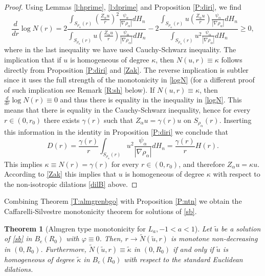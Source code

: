 \documentclass[11pt]{amsart}
\theoremstyle{plain}
\newtheorem{thrm}{Theorem}[section]
\numberwithin{equation}{section}
\begin{document}
\begin{proof}
Using Lemmas \ref{l:hprime}, \ref{l:dprime} and Proposition \ref{P:diri}, we find
\begin{equation}\label{logN}
\frac{d}{dr} \log N(r) = 2 \frac{\int_{S_{\rho_\alpha}(r)}\left(\frac{Z_\alpha u}{r}\right)^2\frac{\psi_\alpha}{|\nabla {\rho_\alpha}|}dH_{n}}{\int_{S_{\rho_\alpha}(r)}u\left(\frac{Z_\alpha u}{r}\right)\frac{\psi_\alpha}{|\nabla {\rho_\alpha}|}dH_{n}} - 2 \frac{\int_{S_{\rho_\alpha}(r)}u\left(\frac{Z_\alpha u}{r}\right)\frac{\psi_\alpha}{|\nabla {\rho_\alpha}|}dH_{n}}{\int_{S_{\rho_\alpha}(r)} u^2\frac{\psi_\alpha}{|\nabla {\rho_\alpha}|}dH_{n}}\ge 0,
\end{equation}
where in the last inequality we have used Cauchy-Schwarz inequality. The implication that if $u$ is homogeneous of degree $\kappa$, then $N(u,r) \equiv \kappa$ follows directly from Proposition  \ref{P:diri} and \eqref{Zak}. The reverse implication is subtler since it uses the full strength of the monotonicity in \eqref{logN} (for a different proof of such implication see Remark \ref{R:sh} below). If $N(u,r) \equiv \kappa$, then $\frac{d}{dr} \log N(r)  \equiv 0$ and thus there is equality in the inequality in \eqref{logN}. This means that there is equality in the Cauchy-Schwarz inequality, hence for every $r\in (0,r_0)$ there exists $\gamma(r)$ such that $Z_\alpha u = \gamma(r) u$ on $S_{\rho_\alpha}(r)$. Inserting this information in the identity in Proposition  \ref{P:diri} we conclude that
\[
D(r) = \frac{\gamma(r)}{r} \int_{S_{\rho_\alpha}(r)}u^2 \frac{\psi_\alpha}{|\nabla {\rho_\alpha}|}dH_{n} = \frac{\gamma(r)}{r} H(r).
\]
This implies $\kappa \equiv N(r) = \gamma(r)$ for every $r\in (0,r_0)$, and therefore $Z_\alpha u = \kappa u$. According to \eqref{Zak}
this implies that $u$ is homogeneous of degree $\kappa$ with respect to the non-isotropic dilations \eqref{dilB} above.

\end{proof}

Combining Theorem \ref{T:almgrenbgo} with Proposition \ref{P:ntn} we obtain the Caffarelli-Silvestre monotonicity theorem for solutions of \eqref{sb}.

\begin{thrm}[Almgren type monotonicity for $L_a, -1<a<1$]\label{T:almgrenext}
Let $\tilde u$ be a solution of \eqref{sb} in $B_e(R_0)$ with ${\varphi}\equiv 0$. Then, $r\to \tilde N(\tilde u,r)$ is monotone non-decreasing in $(0,R_0)$. Furthermore, $\tilde N(\tilde u,r) \equiv \tilde \kappa$ in $(0,R_0)$ if and only if $\tilde u$ is homogeneous of degree $\tilde \kappa$ in $B_e(R_0)$ with respect to the standard Euclidean dilations.
\end{thrm}
\end{document}
